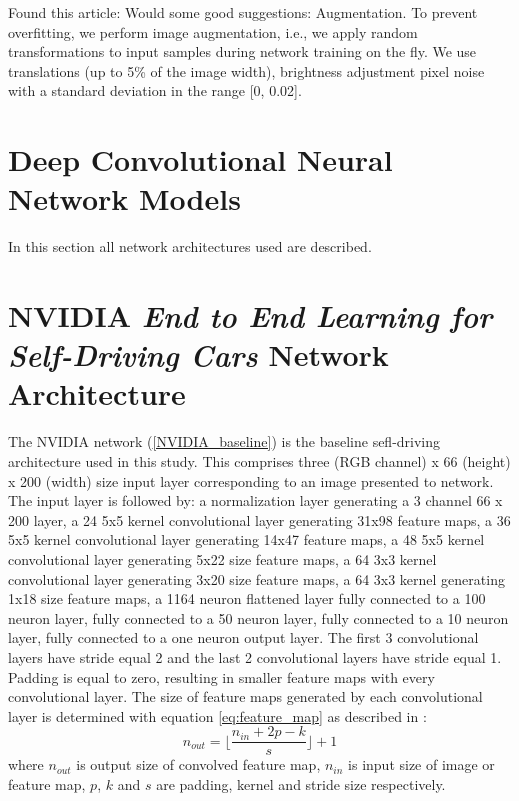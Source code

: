 Found this article:
Would some good suggestions:  
Augmentation. To prevent overfitting, we perform image augmentation, i.e., we
apply random transformations to input samples during network training on the
fly. We use translations (up to 5\% of the image width), brightness adjustment
pixel noise with a standard deviation in the range [0, 0.02].
  
\section{Deep Convolutional Neural Network Models}

In this section all network architectures used are described.

\section{NVIDIA \textit{End to End Learning for Self-Driving Cars} Network Architecture}

The NVIDIA network (\ref{NVIDIA_baseline}) is the baseline sefl-driving architecture used in this study. This comprises three (RGB channel) x 66 (height) x 200 (width) size input layer corresponding to an image presented to network. The input layer is followed by: a normalization layer generating a 3 channel 66 x 200 layer, a 24 5x5 kernel convolutional layer generating 31x98 feature maps, a 36 5x5 kernel convolutional layer generating 14x47 feature maps, a 48 5x5 kernel convolutional layer generating 5x22 size feature maps, a 64 3x3 kernel convolutional layer generating 3x20 size feature maps, a 64 3x3 kernel generating 1x18 size feature maps, a 1164 neuron flattened layer fully connected to a 100 neuron layer, fully connected to a 50 neuron layer, fully connected to a 10 neuron layer, fully connected to a one neuron output layer.  
The first 3 convolutional layers have stride equal 2 and the last 2 convolutional layers have stride equal 1. Padding is equal to zero, resulting in smaller feature maps with every convolutional layer.
The size of feature maps generated by each convolutional layer is determined with equation \ref{eq:feature_map} as described in \cite{dumoulin2018guide}:
\begin{equation}
    \label{eq:feature_map}
    n_{out}= \Big\lfloor\frac{n_{in} + 2p -k}{s} \Big\rfloor +1
\end{equation}
where $n_{out}$ is output size of convolved feature map, $n_{in}$ is input size of image or feature map, $p$, $k$ and $s$ are padding, kernel and stride size respectively.  
 
